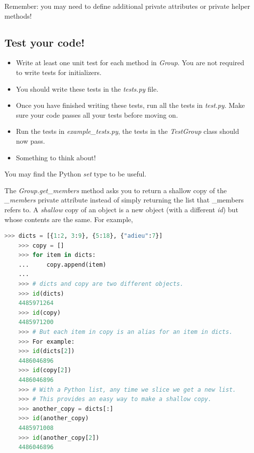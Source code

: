 \documentclass[12pt]{article}
\begin{document}
\bigskip

\noindent Remember: you may need to define additional private attributes or
private helper methods!

\bigskip

\subsection*{Test your code!}
\begin{itemize}
    \item Write at least one unit test for each method in \textit{Group}. You are
    not required to write tests for initializers.
    \item You should write these tests in the \textit{tests.py} file.
    \item Once you have finished writing these tests, run all the tests in \textit{test.py}.
    Make sure your code passes all your tests before moving on.
    \item Run the tests in \textit{example\_tests.py}, the tests in the \textit{TestGroup}
    class should now pass.
    \item Something to think about!
\end{itemize}

\bigskip

\noindent You may find the Python \textit{set} type to be useful.

\bigskip

\noindent The \textit{Group.get\_members} method asks you to return a shallow
copy of the \textit{\_members} private attribute instead of simply returning the list that
\_members refers to. A \textit{shallow} copy of an object is a new object (with a different
\textit{id}) but whose contents are the same. For example,

\bigskip

\begin{lstlisting}[language=python]
    >>> dicts = [{1:2, 3:9}, {5:18}, {"adieu":7}]
    >>> copy = []
    >>> for item in dicts:
    ...     copy.append(item)
    ...
    >>> # dicts and copy are two different objects.
    >>> id(dicts)
    4485971264
    >>> id(copy)
    4485971200
    >>> # But each item in copy is an alias for an item in dicts.
    >>> For example:
    >>> id(dicts[2])
    4486046896
    >>> id(copy[2])
    4486046896
    >>> # With a Python list, any time we slice we get a new list.
    >>> # This provides an easy way to make a shallow copy.
    >>> another_copy = dicts[:]
    >>> id(another_copy)
    4485971008
    >>> id(another_copy[2])
    4486046896
\end{lstlisting}
\end{document}
